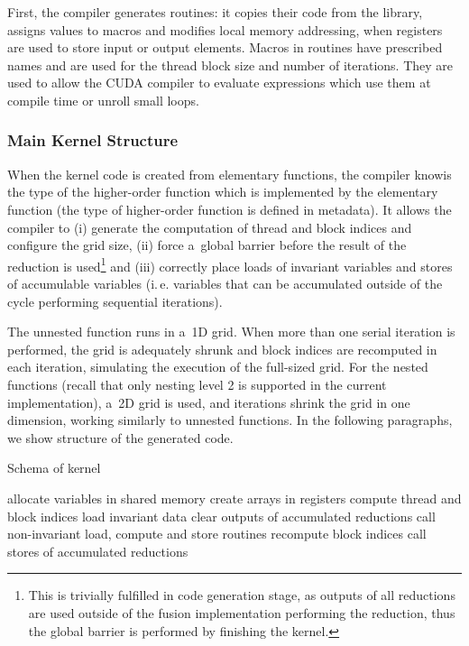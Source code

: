 \documentclass[final]{siamltex}
\def\ie{i.\,e.}
\begin{document}
{First, the compiler generates routines: it copies their code from the library, assigns values to macros and modifies local memory addressing, when registers are used to store input or output elements. Macros in routines have prescribed names and are used for the thread block size and number of iterations. They are used to allow the CUDA compiler to evaluate expressions which use them at compile time or unroll small loops.

\subsubsection{Main Kernel Structure}

When the kernel code is created from elementary functions, the compiler knowis the type of the higher-order function which is implemented by the elementary function (the type of higher-order function is defined in metadata). It allows the compiler to (i) generate the computation of thread and block indices and configure the grid size, (ii) force a~global barrier before the result of the reduction is used\footnote{This is trivially fulfilled in code generation stage, as outputs of all reductions are used outside of the fusion implementation performing the reduction, thus the global barrier is performed by finishing the kernel.} and (iii) correctly place loads of invariant variables and stores of accumulable variables (\ie{} variables that can be accumulated outside of the cycle performing sequential iterations).

The unnested function runs in a~1D grid. When more than one serial iteration is performed, the grid is adequately shrunk and block indices are recomputed in each iteration, simulating the execution of the full-sized grid. For the nested functions (recall that only nesting level 2 is supported in the current implementation), a~2D grid is used, and iterations shrink the grid in one dimension, working similarly to unnested functions. In the following paragraphs, we show structure of the generated code.

\begin{algorithm}[subsection]
\caption{Schema of kernel}
\label{alg:kernel}
{
\begin{algorithmic}[1]
{
\STATE allocate variables in shared memory
\STATE create arrays in registers
\STATE compute thread and block indices
\STATE load invariant data
\STATE clear outputs of accumulated reductions
\STATE call non-invariant load, compute and store routines
\STATE recompute block indices
\ENDFOR
\STATE call stores of accumulated reductions
}
\end{algorithmic}
}
\end{algorithm}

}
\end{document}
